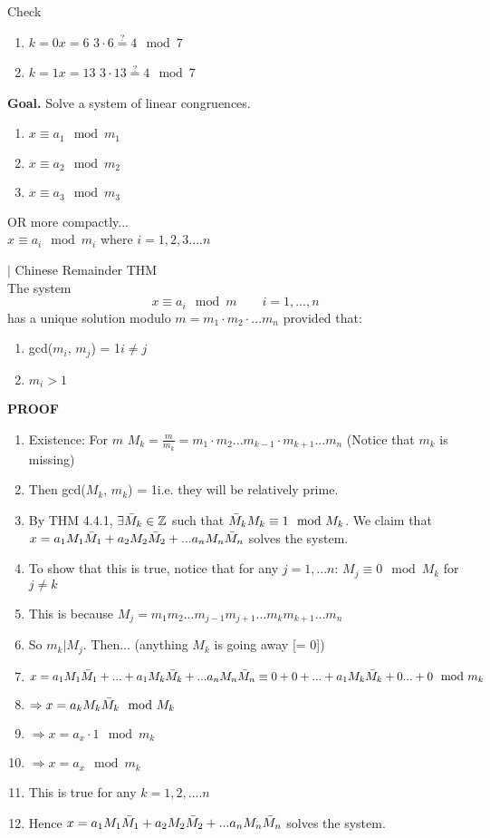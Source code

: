 \documentclass [12pt]{article}
\begin{document}
Check
\begin{enumerate}[\quad]
    \item $k=0$\quad $x=6$ \quad $3\cdot6\stackrel{?}{=}4\mod7$ \quad \checkmark
    \item $k=1$\quad $x=13$ \quad $3\cdot13\stackrel{?}{=}4\mod7$ \quad \checkmark
\end{enumerate}
\pagebreak
\noindent\textbf{Goal.} Solve a system of linear congruences.
\begin{enumerate}[\quad]
    \item $x\equiv a_1\mod m_1$
    \item $x\equiv a_2\mod m_2$
    \item $x\equiv a_3\mod m_3$
\end{enumerate}
OR more compactly...\\
\indent $x\equiv a_i\mod m_i$ where $i=1,2,3....n$
\begin{framed}
\noindent$|$ Chinese Remainder THM\\
The system
\[x\equiv a_i\mod m \quad\quad i=1,...,n\]
has a unique solution modulo $m = m_1\cdot m_2\cdot ... m_n$ provided that:
\begin{enumerate}[\quad (i)]
    \item gcd($m_i$, $m_j$) = 1\quad $i\neq j$
    \item $m_i > 1$
\end{enumerate}
\end{framed}
\noindent\textbf{PROOF}
\begin{enumerate}[\quad]
    \item Existence: For $m$ $M_k=\frac{m}{m_k} = m_1\cdot m_2 ... m_{k-1}\cdot m_{k+1} ... m_n$ \quad (Notice that $m_k$ is missing)
    \item Then gcd($M_k$, $m_k$) = 1\quad i.e. they will be relatively prime.
    \item By THM 4.4.1, $\exists\Bar{M}_k\in\mathbb{Z}$ such that $\Bar{M}_kM_k\equiv1\mod M_k$. We claim that $x=a_1M_1\Bar{M}_1+a_2M_2\Bar{M}_2+...a_nM_n\Bar{M}_n$ solves the system.
    \item To show that this is true, notice that for any $j=1,... n$: $M_j\equiv0\mod M_k$ for $j\neq k$
    \item This is because $M_j=m_1m_2...m_{j-1}m_{j+1}...m_km_{k+1}...m_n$
    \item So $m_k|M_j$. Then... (anything $M_k$ is going away [= 0])
    \item $x=a_1M_1\Bar{M}_1+...+a_1M_k\Bar{M}_k+...a_nM_n\Bar{M}_n\equiv 0+0+...+a_1M_k\Bar{M}_k+0...+0\mod m_k$
    \item $\Rightarrow x=a_kM_k\Bar{M}_k\mod M_k$
    \item $\Rightarrow x=a_x\cdot1\mod m_k$
    \item $\Rightarrow x=a_x\mod m_k$
    \item This is true for any $k=1,2,.... n$
    \item Hence $x=a_1M_1\Bar{M}_1+a_2M_2\Bar{M}_2+...a_nM_n\Bar{M}_n$ solves the system.
\end{enumerate}
\end{document}
